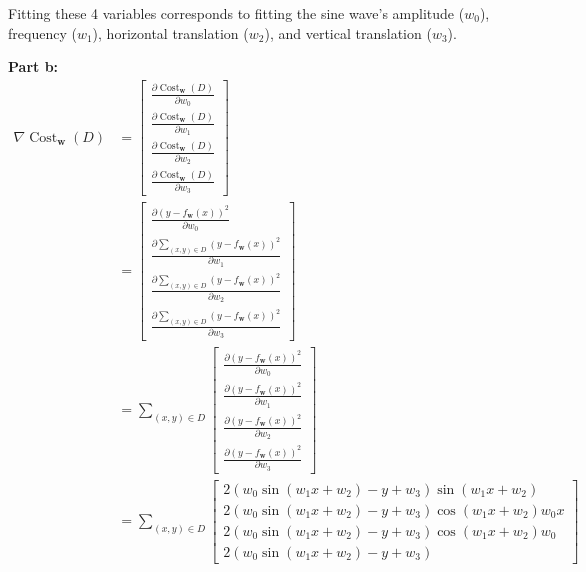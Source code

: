 \documentclass{article}
\begin{document}
Fitting these 4 variables corresponds to fitting the sine wave's amplitude ($w_0$), frequency ($w_1$), horizontal translation ($w_2$), and vertical translation ($w_3$). 
\bigskip

\noindent\textbf{Part b:}
\begin{align*}
  \nabla\operatorname{Cost}_{\mathbf w}(D)&=\begin{bmatrix}
    \frac{\partial\operatorname{Cost}_{\mathbf w}(D)}{\partial w_0}\\
    \frac{\partial\operatorname{Cost}_{\mathbf w}(D)}{\partial w_1}\\
    \frac{\partial\operatorname{Cost}_{\mathbf w}(D)}{\partial w_2}\\
    \frac{\partial\operatorname{Cost}_{\mathbf w}(D)}{\partial w_3}
  \end{bmatrix}\tag{def. of gradient}\\
  &=\begin{bmatrix}
    \frac{\partial(y-f_{\mathbf w}(x))^2}{\partial w_0}\\
    \frac{\partial\sum_{(x,y)\in D}(y-f_{\mathbf w}(x))^2}{\partial w_1}\\
    \frac{\partial\sum_{(x,y)\in D}(y-f_{\mathbf w}(x))^2}{\partial w_2}\\
    \frac{\partial\sum_{(x,y)\in D}(y-f_{\mathbf w}(x))^2}{\partial w_3}
  \end{bmatrix}\tag{def. of Cost}\\
  &=\sum_{(x,y)\in D}\begin{bmatrix}
    \frac{\partial(y-f_{\mathbf w}(x))^2}{\partial w_0}\\
    \frac{\partial(y-f_{\mathbf w}(x))^2}{\partial w_1}\\
    \frac{\partial(y-f_{\mathbf w}(x))^2}{\partial w_2}\\
    \frac{\partial(y-f_{\mathbf w}(x))^2}{\partial w_3}
  \end{bmatrix}\tag{linearity}\\
  &=\sum_{(x,y)\in D}\begin{bmatrix}
    2(w_0\sin(w_1x+w_2)-y+w_3)\sin(w_1x+w_2)\\
    2(w_0\sin(w_1x+w_2)-y+w_3)\cos(w_1x+w_2)w_0x\\
    2(w_0\sin(w_1x+w_2)-y+w_3)\cos(w_1x+w_2)w_0\\
    2(w_0\sin(w_1x+w_2)-y+w_3)
  \end{bmatrix}\tag{calculate partial derivatives}
\end{align*}
\bigskip
\end{document}
